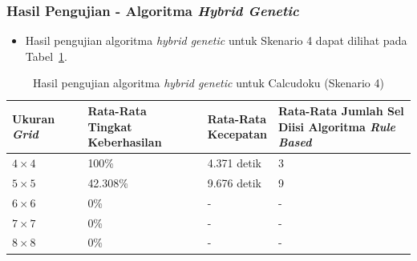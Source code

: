 \documentclass{beamer}
\begin{document}
\begin{frame}
\frametitle{Hasil Pengujian - Algoritma \textit{Hybrid Genetic}}
\begin{itemize}
\item Hasil pengujian algoritma \textit{hybrid genetic} untuk Skenario 4 dapat dilihat pada Tabel~\ref{tab:pengujianhg4}.
\end{itemize}
\begin{table}
\tiny
\centering
\captionsetup{justification=centering}
\caption[Hasil pengujian algoritma \textit{hybrid genetic} untuk Calcudoku (Skenario 4)]{Hasil pengujian algoritma \textit{hybrid genetic} untuk Calcudoku (Skenario 4)}
\begin{tabular}{| l | l | l | l |}
\hline
Ukuran \textit{Grid} & \makecell[c]{Rata-Rata \\ Tingkat Keberhasilan} & \makecell[c]{Rata-Rata \\ Kecepatan} & \makecell[c]{Rata-Rata Jumlah Sel \\ Diisi Algoritma \textit{Rule Based}} \\
\hline \hline
\begin{math}4 \times 4\end{math} & 100\% & 4.371 detik & 3 \\
\hline
\begin{math}5 \times 5\end{math} & 42.308\% & 9.676 detik & 9 \\
\hline
\begin{math}6 \times 6\end{math} & 0\% & - & - \\
\hline
\begin{math}7 \times 7\end{math} & 0\% & - & - \\
\hline
\begin{math}8 \times 8\end{math} & 0\% & - & - \\
\hline
\end{tabular}
\label{tab:pengujianhg4}
\end{table}
\end{frame}

\end{document}
